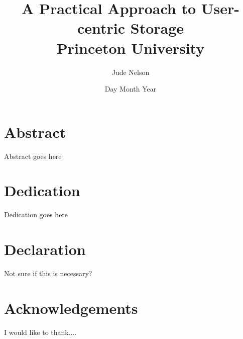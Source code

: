 \documentclass[12pt]{report}
\title{
	{A Practical Approach to User-centric Storage}\\
	{\large Princeton University}\\
}
\author{Jude Nelson}
\date{Day Month Year}
\begin{document}
\maketitle

\chapter*{Abstract}

Abstract goes here

\chapter*{Dedication}

Dedication goes here

\chapter*{Declaration}

Not sure if this is necessary?

\chapter*{Acknowledgements}

I would like to thank....

\tableofcontents









 
\end{document}
